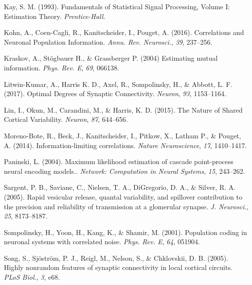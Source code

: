 \documentclass[12pt]{article}
\begin{document}
\begin{thebibliography}{100}
Kay, S. M. (1993).
\newblock Fundamentals of Statistical Signal Processing, Volume I: Estimation Theory.
\newblock \emph{Prentice-Hall}.

Kohn, A., Coen-Cagli, R., Kanitscheider, I., Pouget, A. (2016).
\newblock Correlations and Neuronal Population Information.
\newblock \emph{Annu. Rev. Neurosci.}, \emph{39}, 237--256.

Kraskov, A., St{\"o}gbauer H., \& Grassberger P. (2004)
\newblock Estimating mutual information.
\newblock \emph{Phys. Rev. E},
\emph{69}, 066138.

Litwin-Kumar, A., Harris K. D., Axel, R., Sompolinsky, H., \& Abbott, L. F. (2017).
\newblock Optimal Degrees of Synaptic Connectivity.
\newblock \emph{Neuron}, \emph{93}, 1153--1164.

Lin, I., Okun, M., Carandini, M., \& Harris, K. D. (2015).
\newblock The Nature of Shared Cortical Variability.
\newblock \emph{Neuron}, \emph{87}, 644--656.

Moreno-Bote, R., Beck, J., Kanitscheider, I., Pitkow, X., Latham P., \& Pouget, A. (2014).
\newblock Information-limiting correlations.
\newblock \emph{Nature Neuroscience}, \emph{17}, 1410--1417.

Paninski, L. (2004).
\newblock Maximum likelihood estimation of cascade point-process neural
encoding models..
\newblock \emph{Network: Computation in Neural Systems}, \emph{15}, 243--262.

Sargent, P. B., Saviane, C., Nielsen, T. A., DiGregorio, D. A., \& Silver, R. A. (2005).
\newblock Rapid vesicular release, quantal variability, and spillover contribution to the precision and reliability of transmission at a glomerular synapse. 
\newblock \emph{J. Neurosci.}, \emph{25}, 8173--8187.

Sompolinsky, H., Yoon, H., Kang, K., \& Shamir, M. (2001).
\newblock Population coding in neuronal systems with correlated noise.
\newblock \emph{Phys. Rev. E}, \emph{64}, 051904.

Song, S., Sj{\"o}str{\"o}m, P. J., Reigl, M., Nelson, S., \& Chklovskii, D. B. (2005).
\newblock Highly nonrandom features of synaptic connectivity in local cortical circuits.
\newblock \emph{PLoS Biol.}, \emph{3}, e68.


\end{thebibliography}
\end{document}
